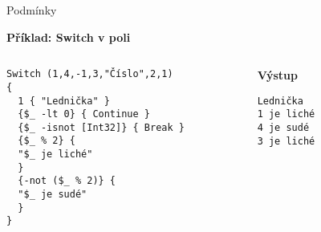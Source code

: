 \documentclass[main.tex]{subfiles}
\begin{document}
\begin{frame}{Podmínky}
\begin{itemize}
  \end{itemize}
\framebreak
\noindent \textbf{Příklad: Switch v poli}
\vspace{3mm}
  \begin{columns}
    \begin{column}{0.6\textwidth}
 \begin{verbatim}
Switch (1,4,-1,3,"Číslo",2,1)
{
  1 { "Lednička" }
  {$_ -lt 0} { Continue }
  {$_ -isnot [Int32]} { Break }
  {$_ % 2} {
  "$_ je liché"
  }
  {-not ($_ % 2)} {
  "$_ je sudé"
  }
}     
 \end{verbatim}
    \end{column}
    \begin{column}{0.3\textwidth}
      \textbf{Výstup}
      \begin{verbatim}
Lednička
1 je liché
4 je sudé
3 je liché       
      \end{verbatim}

    \end{column}
  \end{columns}
\end{frame}
\end{document}
